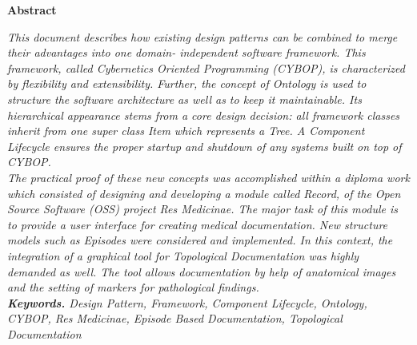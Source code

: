 %
%
%
%
%
%
%

\begin{center}
    \textbf{\large{Abstract}}
\end{center}
\normalsize
\textit{
This document describes how existing design patterns can be combined to merge
their advantages into one domain- independent software framework.
This framework, called Cybernetics Oriented Programming (CYBOP), is characterized
by flexibility and extensibility. Further, the concept of Ontology is used to
structure the software architecture as well as to keep it maintainable. Its
hierarchical appearance stems from a core design decision: all framework classes
inherit from one super class Item which represents a Tree. A Component Lifecycle
ensures the proper startup and shutdown of any systems built on top of CYBOP.\\
The practical proof of these new concepts was accomplished within a diploma work
which consisted of designing and developing a module called Record, of the Open
Source Software (OSS) project Res Medicinae. The major task of this module is to
provide a user interface for creating medical documentation.
New structure models such as Episodes were considered and implemented. In this
context, the integration of a graphical tool for Topological Documentation was
highly demanded as well. The tool allows documentation by help of anatomical
images and the setting of markers for pathological findings.\\
\textbf{Keywords.} Design Pattern, Framework, Component Lifecycle, Ontology,
CYBOP, Res Medicinae, Episode Based Documentation, Topological Documentation
} \rm

